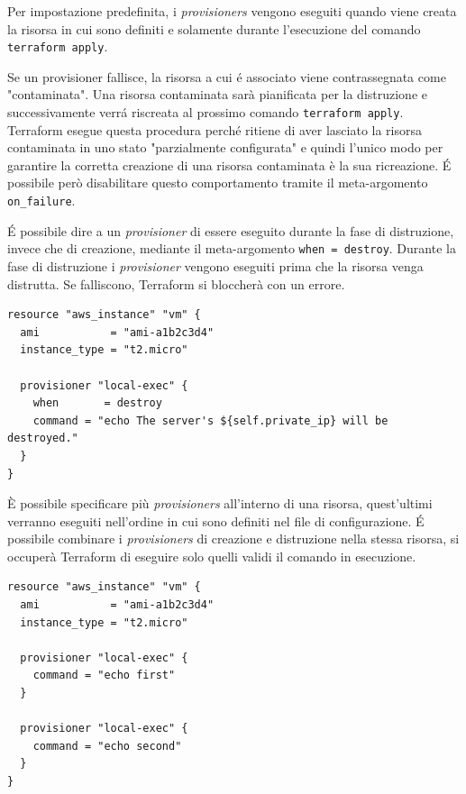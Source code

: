 \documentclass[12pt, a4paper, titlepage]{article}
\newenvironment{code}{\captionsetup{type=listing}}{}
\begin{document}
Per impostazione predefinita, i \textit{provisioners} vengono eseguiti quando viene creata la risorsa in cui sono definiti e solamente durante l'esecuzione del comando \texttt{terraform apply}.
\bigskip

Se un provisioner fallisce, la risorsa a cui é associato viene contrassegnata come "contaminata". Una risorsa contaminata sarà pianificata per la distruzione e successivamente verrá riscreata al prossimo comando \texttt{terraform apply}. Terraform esegue questa procedura perché ritiene di aver lasciato la risorsa contaminata in uno stato "parzialmente configurata" e quindi l'unico modo per garantire la corretta creazione di una risorsa contaminata è la sua ricreazione. É possibile però disabilitare questo comportamento tramite il meta-argomento \texttt{on\_failure}.
\bigskip

É possibile dire a un \textit{provisioner} di essere eseguito durante la fase di distruzione, invece che di creazione, mediante il meta-argomento \texttt{when = destroy}. Durante la fase di distruzione i \textit{provisioner} vengono eseguiti prima che la risorsa venga distrutta. Se falliscono, Terraform si bloccherà  con un errore.

 \begin{code}
	\begin{verbatim}
resource "aws_instance" "vm" {
  ami           = "ami-a1b2c3d4"
  instance_type = "t2.micro"

  provisioner "local-exec" {
    when       = destroy
    command = "echo The server's ${self.private_ip} will be destroyed."
  }
}
	\end{verbatim}
\end{code}
\bigskip

È possibile specificare più \textit{provisioners} all'interno di una risorsa, quest'ultimi verranno eseguiti nell'ordine in cui sono definiti nel file di configurazione. É possibile combinare i \textit{provisioners} di creazione e distruzione nella stessa risorsa, si occuperà Terraform di eseguire solo quelli validi il comando in esecuzione.

\begin{code}
	\begin{verbatim}
resource "aws_instance" "vm" {
  ami           = "ami-a1b2c3d4"
  instance_type = "t2.micro"

  provisioner "local-exec" {
    command = "echo first"
  }

  provisioner "local-exec" {
    command = "echo second"
  }
}
	\end{verbatim}
\end{code}
\bigskip
\end{document}
